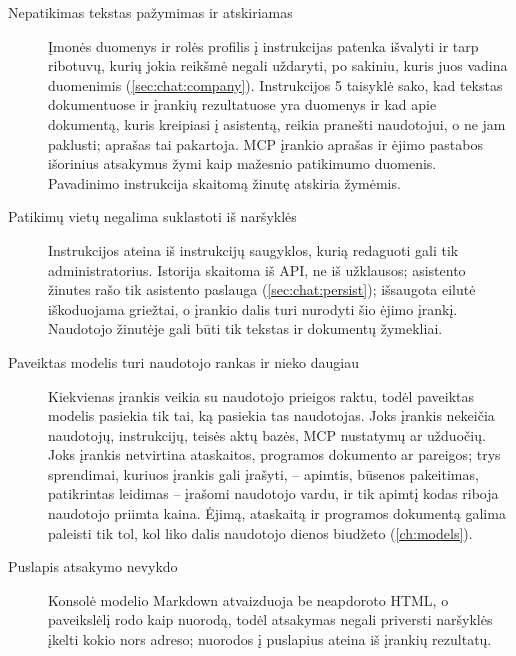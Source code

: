 \begin{description}
  \item[Nepatikimas tekstas pažymimas ir atskiriamas] Įmonės duomenys ir rolės profilis į
    instrukcijas patenka išvalyti ir tarp ribotuvų, kurių jokia reikšmė negali uždaryti, po
    sakiniu, kuris juos vadina duomenimis (\cref{sec:chat:company}). Instrukcijos 5 taisyklė sako,
    kad tekstas dokumentuose ir įrankių rezultatuose yra duomenys ir kad apie dokumentą, kuris
    kreipiasi į asistentą, reikia pranešti naudotojui, o ne jam paklusti; 
    aprašas tai pakartoja. MCP įrankio aprašas ir ėjimo pastabos išorinius atsakymus žymi kaip
    mažesnio patikimumo duomenis. Pavadinimo instrukcija skaitomą žinutę atskiria žymėmis.
  \item[Patikimų vietų negalima suklastoti iš naršyklės] Instrukcijos ateina iš instrukcijų
    saugyklos, kurią redaguoti gali tik administratorius. Istorija skaitoma iš API, ne iš
    užklausos; asistento žinutes rašo tik asistento paslauga (\cref{sec:chat:persist}); išsaugota
    eilutė iškoduojama griežtai, o įrankio dalis turi nurodyti šio ėjimo įrankį. Naudotojo
    žinutėje gali būti tik tekstas ir dokumentų žymekliai.
  \item[Paveiktas modelis turi naudotojo rankas ir nieko daugiau] Kiekvienas įrankis veikia su
    naudotojo prieigos raktu, todėl paveiktas modelis pasiekia tik tai, ką pasiekia tas
    naudotojas. Joks įrankis nekeičia naudotojų, instrukcijų, teisės aktų bazės, MCP nustatymų ar
    užduočių. Joks įrankis netvirtina ataskaitos, programos dokumento ar pareigos; trys sprendimai,
    kuriuos įrankis gali įrašyti, -- apimtis, būsenos pakeitimas, patikrintas leidimas -- įrašomi
    naudotojo vardu, ir tik apimtį kodas riboja naudotojo priimta kaina. Ėjimą, ataskaitą ir
    programos dokumentą galima paleisti tik tol, kol liko dalis naudotojo dienos biudžeto
    (\cref{ch:models}).
  \item[Puslapis atsakymo nevykdo] Konsolė modelio Markdown atvaizduoja be neapdoroto HTML, o
    paveikslėlį rodo kaip nuorodą, todėl atsakymas negali priversti naršyklės įkelti kokio nors
    adreso; nuorodos į puslapius ateina iš įrankių rezultatų.
\end{description}


